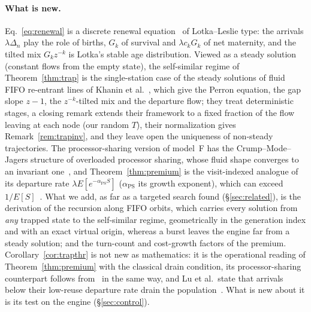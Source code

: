 \paragraph{What is new.} Eq.~\eqref{eq:renewal} is a discrete renewal equation~\citep{feller1968introduction} of Lotka--Leslie type:
the arrivals $\lambda\Delta_n$ play the role of births, $G_k$ of survival and $\lambda c_kG_k$ of net maternity, and the tilted mix
$G_kz^{-k}$ is Lotka's stable age distribution. Viewed as a steady solution (constant flows from the empty state), the self-similar
regime of Theorem~\ref{thm:trap} is the single-station case of the steady solutions of fluid FIFO re-entrant lines of Khanin et
al.~\citep{khanin2001steady}, which give the Perron equation, the gap slope $z-1$, the $z^{-k}$-tilted mix and the departure flow; they treat
deterministic stages, a closing remark extends their framework to a fixed fraction of the flow leaving at each node (our random
$T$), their normalization gives Remark~\ref{rem:trapinv}, and they leave open the uniqueness of non-steady trajectories. The processor-sharing
version of model~F has the Crump--Mode--Jagers structure of overloaded processor sharing, whose fluid shape converges to an invariant
one~\citep{grishechkin1992processor,jeanmarie1994transient,puha2006overloaded}, and Theorem~\ref{thm:premium} is the visit-indexed
analogue of its departure rate $\lambda E[e^{-\alpha_{\mathrm{PS}}S}]$ ($\alpha_{\mathrm{PS}}$ its growth exponent), which can exceed
$1/E[S]$~\citep{jeanmarie1994transient}. What we add, as far
as a targeted search found (\S\ref{sec:related}), is the derivation of the recursion along FIFO orbits, which carries every solution
from \emph{any} trapped state to the self-similar regime, geometrically in the generation index and with an exact virtual origin,
whereas a burst leaves the engine far from a steady solution; and the turn-count and cost-growth factors of the premium.
Corollary~\ref{cor:trapthr} is not new as mathematics: it is the operational reading of Theorem~\ref{thm:premium} with the classical
drain condition, its processor-sharing counterpart follows from~\citep{jeanmarie1994transient} in the same way, and Lu et al.\ state
that arrivals below their low-reuse departure rate drain the population~\citep{lu2026cachetrap}. What is new about it is its test on
the engine (\S\ref{sec:control}).

